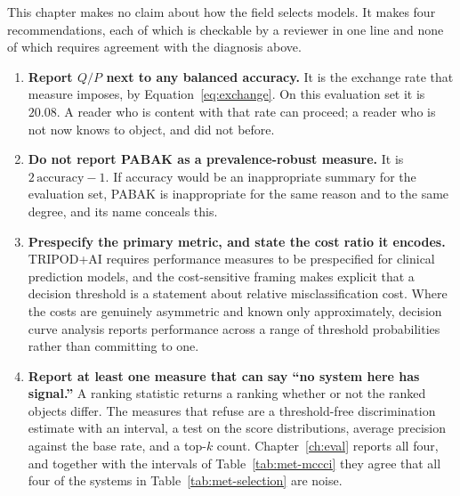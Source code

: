 This chapter makes no claim about how the field selects models. It makes four
recommendations, each of which is checkable by a reviewer in one line and none
of which requires agreement with the diagnosis above.

\begin{enumerate}
\item \textbf{Report $Q/P$ next to any balanced accuracy.} It is the exchange
      rate that measure imposes, by Equation~\eqref{eq:exchange}. On this
      evaluation set it is $20.08$. A reader who is content with that rate can
      proceed; a reader who is not now knows to object, and did not before.

\item \textbf{Do not report PABAK as a prevalence-robust measure.} It is
      $2\,\mathrm{accuracy} - 1$. If accuracy would be an inappropriate summary
      for the evaluation set, PABAK is inappropriate for the same reason and to
      the same degree, and its name conceals this.

\item \textbf{Prespecify the primary metric, and state the cost ratio it
      encodes.} TRIPOD+AI \citep{collins2024tripodai} requires performance
      measures to be prespecified for clinical prediction models, and the
      cost-sensitive framing \citep{elkan2001cost} makes explicit that a
      decision threshold is a statement about relative misclassification cost.
      Where the costs are genuinely asymmetric and known only approximately,
      decision curve analysis \citep{vickers2006dca} reports performance across
      a range of threshold probabilities rather than committing to one.

\item \textbf{Report at least one measure that can say ``no system here has
      signal.''} A ranking statistic returns a ranking whether or not the ranked
      objects differ. The measures that refuse are a threshold-free
      discrimination estimate with an interval, a test on the score
      distributions, average precision against the base rate, and a top-$k$
      count. Chapter~\ref{ch:eval} reports all four, and together with the
      intervals of Table~\ref{tab:met-mccci} they agree that all four of the
      systems in Table~\ref{tab:met-selection} are noise.
\end{enumerate}


